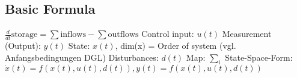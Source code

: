 \subsection{Basic Formula}
    $\frac{d}{dt} \text{storage} = \sum \text{inflows} - \sum \text{outflows}$
    Control input: $u(t)$
    Measurement (Output): $y(t)$
    State: $x(t)$, dim(x) = Order of system (vgl. Anfangsbedingungen DGL)
    Disturbances: $d(t)$
    Map: $\sum_i$
    State-Space-Form: $\dot{x}(t) = f(x(t), u(t), d(t)), y(t) = f(x(t), u(t), d(t))$
    